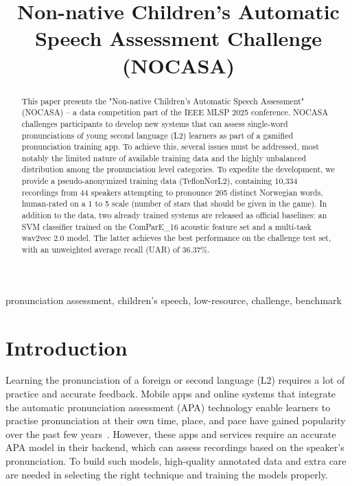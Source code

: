 \documentclass{article}
\title{Non-native Children's Automatic Speech Assessment Challenge (NOCASA)}
\begin{document}
%
\maketitle
%
\begin{abstract}

This paper presents the "Non-native Children's Automatic Speech Assessment" (NOCASA)  -- a data competition part of the IEEE MLSP 2025 conference. NOCASA challenges participants to develop new systems that can assess single-word pronunciations of young second language (L2) learners as part of a gamified pronunciation training app. To achieve this, several issues must be addressed, most notably the limited nature of available training data and the highly unbalanced distribution among the pronunciation level categories.
To expedite the development, we provide a pseudo-anonymized training data (TeflonNorL2), containing 10,334 recordings from 44 speakers attempting to pronounce 205 distinct Norwegian words, human-rated on a 1 to 5 scale (number of stars that should be given in the game).   
In addition to the data, two already trained systems are released as official baselines:
an SVM classifier trained on the ComParE\_16 acoustic feature set and a multi-task wav2vec 2.0 model. The latter achieves the best performance on the challenge test set, with an unweighted average recall (UAR) of 36.37\%.

\end{abstract}
%
\begin{keywords}
pronunciation assessment, children's speech, low-resource, challenge, benchmark
\end{keywords}
%
\section{Introduction}
\label{sec:intro}

Learning the pronunciation of a foreign or second language (L2) requires a lot of practice and accurate feedback. Mobile apps and online systems that integrate the automatic pronunciation assessment (APA) technology enable learners to practise pronunciation at their own time, place, and pace have gained popularity over the past few years~\cite{10214276,kheir-etal-2023-automatic}. However, these apps and services require an accurate APA model in their backend, which can assess recordings based on the speaker's pronunciation. To build such models, high-quality annotated data and extra care are needed in selecting the right technique and training the models properly. 
\end{document}
